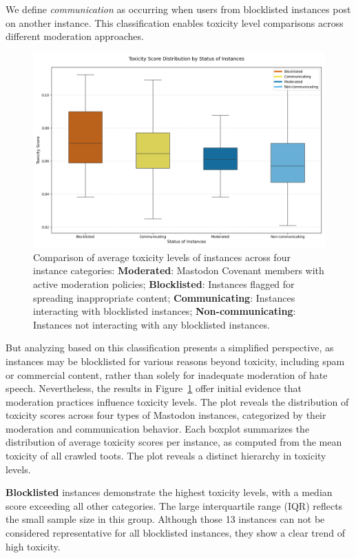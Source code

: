 We define \emph{communication} as occurring when users from blocklisted instances post on another instance. This classification enables toxicity level comparisons across different moderation approaches.

\begin{figure}[tb]
    \centering
    \includegraphics[width=\textwidth]{../material/blocklist_vs_covenant_boxplot.png}
    \caption{Comparison of average toxicity levels of instances across four instance categories: 
    \textbf{Moderated}: Mastodon Covenant members with active moderation policies;
    \textbf{Blocklisted}: Instances flagged for spreading inappropriate content; 
    \textbf{Communicating}: Instances interacting with blocklisted instances; 
    \textbf{Non-communicating}: Instances not interacting with any blocklisted instances.}
    \label{blocklisted-vs-covenant}
\end{figure}

But analyzing based on this classification presents a simplified perspective, as instances may be blocklisted for various reasons beyond toxicity, including spam or commercial content, rather than solely for inadequate moderation of hate speech. Nevertheless, the results in Figure~\ref{blocklisted-vs-covenant} offer initial evidence that moderation practices influence toxicity levels. The plot reveals the distribution of toxicity scores across four types of Mastodon instances, categorized by their moderation and communication behavior. Each boxplot summarizes the distribution of average toxicity scores per instance, as computed from the mean toxicity of all crawled toots. The plot reveals a distinct hierarchy in toxicity levels. 

\textbf{Blocklisted} instances demonstrate the highest toxicity levels, with a median score exceeding all other categories. The large interquartile range (IQR) reflects the small sample size in this group. Although those 13 instances can not be considered representative for all blocklisted instances, they show a clear trend of high toxicity.

